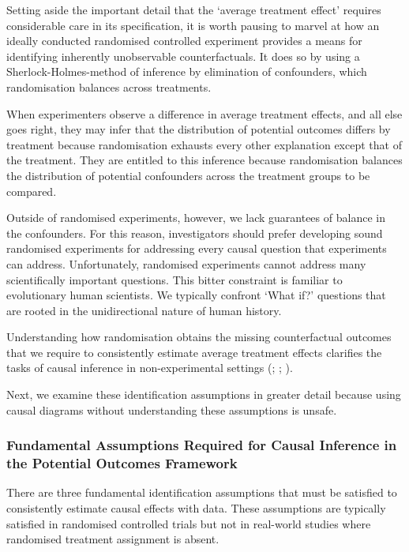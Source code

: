 \documentclass[
  single column]{article}
\begin{document}
Setting aside the important detail that the `average treatment effect'
requires considerable care in its specification, it is worth pausing to
marvel at how an ideally conducted randomised controlled experiment
provides a means for identifying inherently unobservable
counterfactuals. It does so by using a Sherlock-Holmes-method of
inference by elimination of confounders, which randomisation balances
across treatments.

When experimenters observe a difference in average treatment effects,
and all else goes right, they may infer that the distribution of
potential outcomes differs by treatment because randomisation exhausts
every other explanation except that of the treatment. They are entitled
to this inference because randomisation balances the distribution of
potential confounders across the treatment groups to be compared.

Outside of randomised experiments, however, we lack guarantees of
balance in the confounders. For this reason, investigators should prefer
developing sound randomised experiments for addressing every causal
question that experiments can address. Unfortunately, randomised
experiments cannot address many scientifically important questions. This
bitter constraint is familiar to evolutionary human scientists. We
typically confront `What if?' questions that are rooted in the
unidirectional nature of human history.

Understanding how randomisation obtains the missing counterfactual
outcomes that we require to consistently estimate average treatment
effects clarifies the tasks of causal inference in non-experimental
settings (;
;
).

Next, we examine these identification assumptions in greater detail
because using causal diagrams without understanding these assumptions is
unsafe.

\subsubsection{Fundamental Assumptions Required for Causal Inference in
the Potential Outcomes
Framework}\label{fundamental-assumptions-required-for-causal-inference-in-the-potential-outcomes-framework}

There are three fundamental identification assumptions that must be
satisfied to consistently estimate causal effects with data. These
assumptions are typically satisfied in randomised controlled trials but
not in real-world studies where randomised treatment assignment is
absent.
\end{document}
